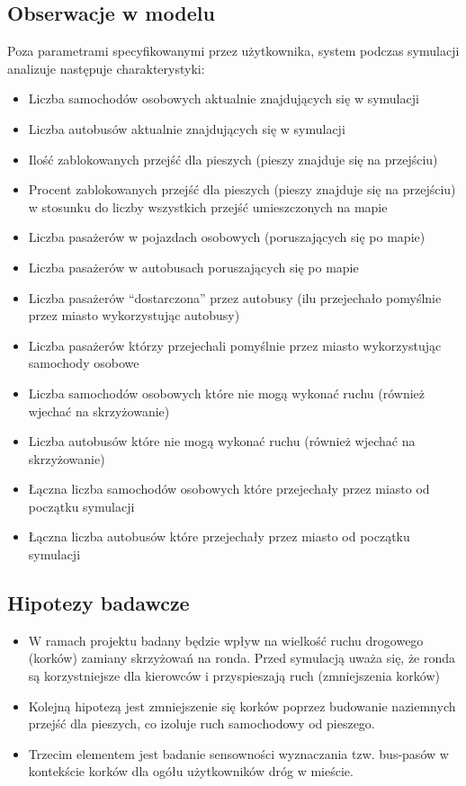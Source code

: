 \documentclass{article}
\begin{document}
\subsection{Obserwacje w modelu}
\label{subsection:obserwacje}
Poza parametrami specyfikowanymi przez użytkownika, system podczas symulacji analizuje następuje charakterystyki:
\begin{itemize}
    \item Liczba samochodów osobowych aktualnie znajdujących się w symulacji
    \item Liczba autobusów aktualnie znajdujących się w symulacji
    \item Ilość zablokowanych przejść dla pieszych (pieszy znajduje się na przejściu)
    \item Procent zablokowanych przejść dla pieszych (pieszy znajduje się na przejściu) w stosunku do liczby wszystkich przejść umieszczonych na mapie
    \item Liczba pasażerów w pojazdach osobowych (poruszających się po mapie)
    \item Liczba pasażerów w autobusach poruszających się po mapie
    \item Liczba pasażerów ``dostarczona'' przez autobusy (ilu przejechało pomyślnie przez miasto wykorzystując autobusy)
    \item Liczba pasażerów którzy przejechali pomyślnie przez miasto wykorzystując samochody osobowe
    \item Liczba samochodów osobowych które nie mogą wykonać ruchu (również wjechać na skrzyżowanie)
    \item Liczba autobusów które nie mogą wykonać ruchu (również wjechać na skrzyżowanie)
    \item Łączna liczba samochodów osobowych które przejechały przez miasto od początku symulacji
    \item Łączna liczba autobusów które przejechały przez miasto od początku symulacji
\end{itemize}

\subsection{Hipotezy badawcze}
\label{subsection:hipotezy}
\begin{itemize}
    \item W ramach projektu badany będzie wpływ na wielkość ruchu drogowego (korków) zamiany skrzyżowań na ronda. Przed symulacją uważa się, że ronda są korzystniejsze dla kierowców i przyspieszają ruch (zmniejszenia korków)

    \item Kolejną hipotezą jest zmniejszenie się korków poprzez budowanie naziemnych przejść dla pieszych, co izoluje ruch samochodowy od pieszego.

    \item Trzecim elementem jest badanie sensowności wyznaczania tzw. bus-pasów w kontekście korków dla ogółu użytkowników dróg w mieście.
\end{itemize}
\end{document}
